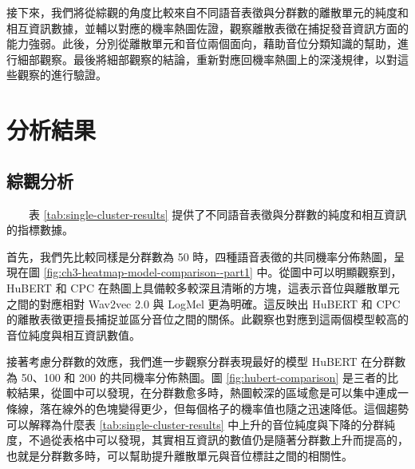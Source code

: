         接下來，我們將從綜觀的角度比較來自不同語音表徵與分群數的離散單元的純度和相互資訊數據，並輔以對應的機率熱圖佐證，觀察離散表徵在捕捉發音資訊方面的能力強弱。此後，分別從離散單元和音位兩個面向，藉助音位分類知識的幫助，進行細部觀察。最後將細部觀察的結論，重新對應回機率熱圖上的深淺規律，以對這些觀察的進行驗證。

\section{分析結果}          %

\subsection{綜觀分析}

　　表 \ref{tab:single-cluster-results} 提供了不同語音表徵與分群數的純度和相互資訊的指標數據。

        首先，我們先比較同樣是分群數為 50 時，四種語音表徵的共同機率分佈熱圖，呈現在圖 \ref{fig:ch3-heatmap-model-comparison--part1} 中。從圖中可以明顯觀察到，HuBERT 和 CPC 在熱圖上具備較多較深且清晰的方塊，這表示音位與離散單元之間的對應相對 Wav2vec 2.0 與 LogMel 更為明確。這反映出 HuBERT 和 CPC 的離散表徵更擅長捕捉並區分音位之間的關係。此觀察也對應到這兩個模型較高的音位純度與相互資訊數值。

        接著考慮分群數的效應，我們進一步觀察分群表現最好的模型 HuBERT 在分群數為 50、100 和 200 的共同機率分佈熱圖。圖 \ref{fig:hubert-comparison} 是三者的比較結果，從圖中可以發現，在分群數愈多時，熱圖較深的區域愈是可以集中連成一條線，落在線外的色塊變得更少，但每個格子的機率值也隨之迅速降低。這個趨勢可以解釋為什麼表 \ref{tab:single-cluster-results} 中上升的音位純度與下降的分群純度，不過從表格中可以發現，其實相互資訊的數值仍是隨著分群數上升而提高的，也就是分群數多時，可以幫助提升離散單元與音位標註之間的相關性。

